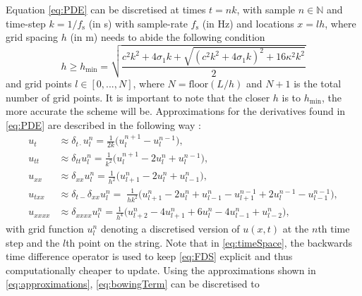     Equation \eqref{eq:PDE} can be discretised at times $t = nk$, with sample $n \in \mathbb{N}$ and time-step $k = 1 / f_\text{s}$ (in s) with sample-rate $f_\text{s}$ (in Hz) and locations $x = lh$, where grid spacing $h$ (in m) needs to abide the following condition \cite{Bilbao2009}
    \begin{equation}\label{eq:stability}
        h \geq h_\text{min} = \sqrt{\frac{c^2k^2+4 \sigma_1k+\sqrt{(c^2k^2+4\sigma_1k)^2+16\kappa^2k^2}}{2}}
    \end{equation}
    and grid points $l \in [0,...,N]$, where $N=\text{floor}(L/h)$ and $N + 1$ is the total number of grid points. It is important to note that the closer $h$ is to $h_\text{min}$, the more accurate the scheme will be. 
    Approximations for the derivatives found in \eqref{eq:PDE} are described in the following way \cite{Bilbao2009}: 
    \begin{subequations}\label{eq:approximations}
        \begin{align}
            \label{eq:centerTime}
            u_{t} &\approx \delta_{t\cdot} u^n_l = \frac{1}{2k}\big(u_l^{n+1}-u_l^{n-1}\big),\\
            \label{eq:secondTime}
            u_{tt} &\approx \delta_{tt}u_l^n = \frac{1}{k^2} \big(u_l^{n+1} - 2u_l^n + u_l^{n-1}\big),\\
            \label{eq:secondSpacex}
            u_{xx} &\approx \delta_{xx}u_l^n = \frac{1}{h^2}\big(u_{l+1}^n - 2u_l^n + u_{l-1}^n\big),\\
            u_{txx} &\approx \label{eq:timeSpace}
            \delta_{t-}\delta_{xx}u_l^n = \; \frac{1}{hk^2}\big(u_{l+1}^n - 2u_l^n + u_{l-1}^n - u_{l+1}^{n-1} + 2u_l^{n-1} - u_{l-1}^{n-1}\big),
            \\
            \label{eq:fourthSpacex}
            u_{xxxx} &\approx\delta_{xxxx}u_l^n = \frac{1}{h^4}\big(u_{l+2}^n - 4u_{l+1}^n + 6u_l^n - 4u_{l-1}^n +u_{l-2}^n\big),
        \end{align}
    \end{subequations}
    with grid function $u_l^n$ denoting a discretised version of $u(x,t)$ at the $n$th time step and the $l$th point on the string. Note that in \eqref{eq:timeSpace}, the backwards time difference operator is used to keep \eqref{eq:FDS} explicit and thus computationally cheaper to update. Using the approximations shown in \eqref{eq:approximations}, \eqref{eq:bowingTerm} can be discretised to
